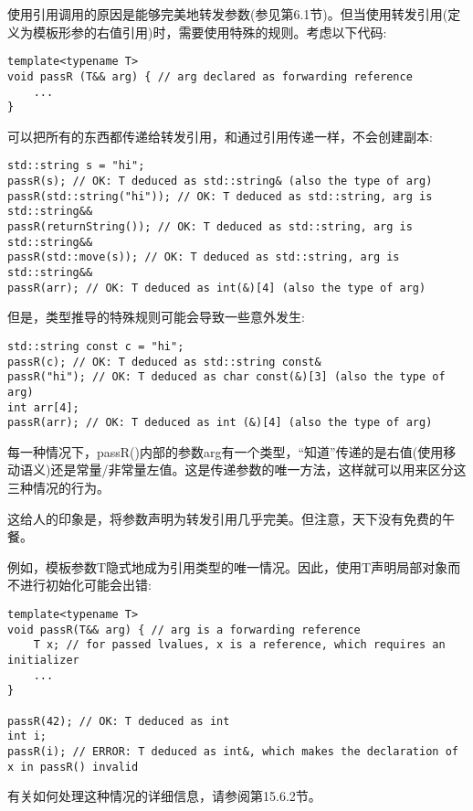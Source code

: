 
使用引用调用的原因是能够完美地转发参数(参见第6.1节)。但当使用转发引用(定义为模板形参的右值引用)时，需要使用特殊的规则。考虑以下代码:

\begin{lstlisting}[style=styleCXX]
template<typename T>
void passR (T&& arg) { // arg declared as forwarding reference
	...
}
\end{lstlisting}

可以把所有的东西都传递给转发引用，和通过引用传递一样，不会创建副本:

\begin{lstlisting}[style=styleCXX]
std::string s = "hi";
passR(s); // OK: T deduced as std::string& (also the type of arg)
passR(std::string("hi")); // OK: T deduced as std::string, arg is std::string&&
passR(returnString()); // OK: T deduced as std::string, arg is std::string&&
passR(std::move(s)); // OK: T deduced as std::string, arg is std::string&&
passR(arr); // OK: T deduced as int(&)[4] (also the type of arg)
\end{lstlisting}

但是，类型推导的特殊规则可能会导致一些意外发生:

\begin{lstlisting}[style=styleCXX]
std::string const c = "hi";
passR(c); // OK: T deduced as std::string const&
passR("hi"); // OK: T deduced as char const(&)[3] (also the type of arg)
int arr[4];
passR(arr); // OK: T deduced as int (&)[4] (also the type of arg)
\end{lstlisting}

每一种情况下，passR()内部的参数arg有一个类型，“知道”传递的是右值(使用移动语义)还是常量/非常量左值。这是传递参数的唯一方法，这样就可以用来区分这三种情况的行为。

这给人的印象是，将参数声明为转发引用几乎完美。但注意，天下没有免费的午餐。

例如，模板参数T隐式地成为引用类型的唯一情况。因此，使用T声明局部对象而不进行初始化可能会出错:

\begin{lstlisting}[style=styleCXX]
template<typename T>
void passR(T&& arg) { // arg is a forwarding reference
	T x; // for passed lvalues, x is a reference, which requires an initializer
	...
}

passR(42); // OK: T deduced as int
int i;
passR(i); // ERROR: T deduced as int&, which makes the declaration of x in passR() invalid
\end{lstlisting}

有关如何处理这种情况的详细信息，请参阅第15.6.2节。




















